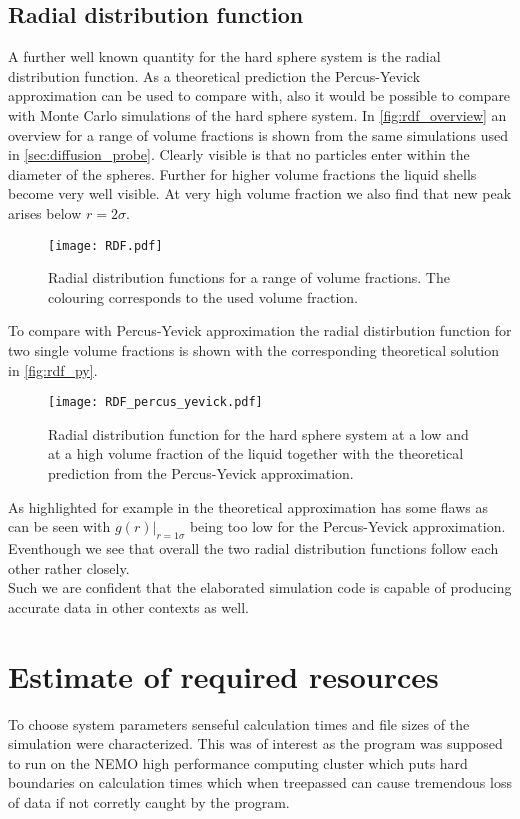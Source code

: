 \subsection{Radial distribution function}
\label{sec:RDF_prob}
A further well known quantity for the hard sphere system is the radial distribution function. As a theoretical prediction the Percus-Yevick approximation can be used to compare with, also it would be possible to compare with Monte Carlo simulations of the hard sphere system. In \autoref{fig:rdf_overview} an overview for a range of volume fractions is shown from the same simulations used in \autoref{sec:diffusion_probe}. Clearly visible is that no particles enter within the diameter of the spheres. Further for higher volume fractions the liquid shells become very well visible. At very high volume fraction we also find that  new peak arises below $r = 2 \sigma$.
\begin{figure}[h]
\centering
\texttt{[image: RDF.pdf]}
\caption{Radial distribution functions for a range of volume fractions. The colouring corresponds to the used volume fraction.}
\label{fig:rdf_overview}
\end{figure}

To compare with Percus-Yevick approximation the radial distirbution function for two single volume fractions is shown with the corresponding theoretical solution in \autoref{fig:rdf_py}.
\begin{figure}[h]
\centering
\texttt{[image: RDF\_percus\_yevick.pdf]}
\caption{Radial distribution function for the hard sphere system at a low and at a high volume fraction of the liquid together with the theoretical prediction from the Percus-Yevick approximation.}
\label{fig:rdf_py}
\end{figure}

As highlighted for example in \cite{Hansen2006} the theoretical approximation has some flaws as can be seen with $g(r)|_{r=1\sigma}$ being too low for the Percus-Yevick approximation. Eventhough we see that overall the two radial distribution functions follow each other rather closely.\\
Such we are confident that the elaborated simulation code is capable of producing accurate data in other contexts as well.\\


\section{Estimate of required resources}
\label{sec:resources}
To choose system parameters senseful calculation times and file sizes of the simulation were characterized. This was of interest as the program was supposed to run on the NEMO high performance computing cluster which puts hard boundaries on calculation times which when treepassed can cause tremendous loss of data if not corretly caught by the program.\\
 
